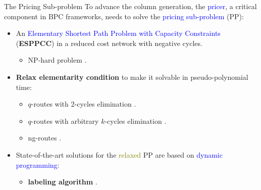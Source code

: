 \begin{frame}{The Pricing Sub-problem}
	To advance the column generation, the \textcolor{blue}{pricer}, a critical component in BPC frameworks, needs to solve the \textcolor{blue}{pricing sub-problem} (PP):
	\begin{itemize}
		\item An \textcolor{blue}{Elementary Shortest Path Problem with Capacity Constraints} (\textbf{ESPPCC}) in a reduced cost network with negative cycles.
		      \begin{itemize}
			      \item NP-hard problem \parencite{dror1994}.
		      \end{itemize}
		\item \textbf{Relax elementarity condition} to make it solvable in pseudo-polynomial time:
		      \begin{itemize}
			      \item $q$-routes with 2-cycles elimination \parencite{christofides1981exact}.
			      \item $q$-routes with arbitrary $k$-cycles elimination \parencite{feillet2004, chabrier2006}.
			      \item ng-routes \parencite{baldacci2011}.
		      \end{itemize}
		\item State-of-the-art solutions for the \textcolor{olive}{relaxed} PP are based on \textcolor{blue}{dynamic programming}:
		      \begin{itemize}
			      \item \textbf{labeling algorithm} \parencite{desrochers1992, feillet2004}.
		      \end{itemize}
	\end{itemize}
\end{frame}

